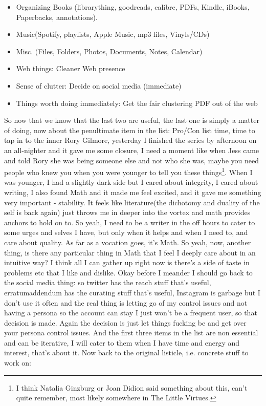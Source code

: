 \begin{itemize}
    \item Organizing Books (librarything, goodreads, calibre, PDFs, Kindle, iBooks, Paperbacks, annotations).
    \item Music(Spotify, playlists, Apple Music, mp3 files, Vinyls/CDs)
    \item Misc. (Files, Folders, Photos, Documents, Notes, Calendar)
    \item Web things: Cleaner Web presence
    \item Sense of clutter: Decide on social media (immediate)
    \item Things worth doing immediately: Get the fair clustering PDF out of the web 
\end{itemize}

So now that we know that the last two are useful, the last one is simply a matter of doing, now about the penultimate item in the list: Pro/Con list time, time to tap in to the inner Rory Gilmore, yesterday I finished the series by afternoon on an all-nighter and it gave me some closure, I need a moment like when Jess came and told Rory she was being someone else and not who she was, maybe you need people who knew you when you were younger to tell you these things\footnote{I think Natalia Ginzburg or Joan Didion said something about this, can't quite remember, most likely somewhere in The Little Virtues.}. When I was younger, I had a slightly dark side but I cared about integrity, I cared about writing, I also found Math and it made me feel excited, and it gave me something very important - stability. It feels like literature(the dichotomy and duality of the self is back again) just throws me in deeper into the vortex and math provides anchors to hold on to. So yeah, I need to be a writer in the off hours to cater to some urges and selves I have, but only when it helps and when I need to, and care about quality. As far as a vocation goes, it's Math. So yeah, now, another thing, is there any particular thing in Math that I feel I deeply care about in an intuitive way? I think all I can gather up right now is there's a side of taste in problems etc that I like and dislike. Okay before I meander I should go back to the social media thing: so twitter has the reach stuff that's useful, erratumaddendum has the curating stuff that's useful, Instagram is garbage but I don't use it often and the real thing is letting go of my control issues and not having a persona so the account can stay I just won't be a frequent user, so that decision is made. Again the decision is just let things fucking be and get over your persona control issues. And the first three items in the list are non essential and can be iterative, I will cater to them when I have time and energy and interest, that's about it. Now back to the original listicle, i.e. concrete stuff to work on:
 



